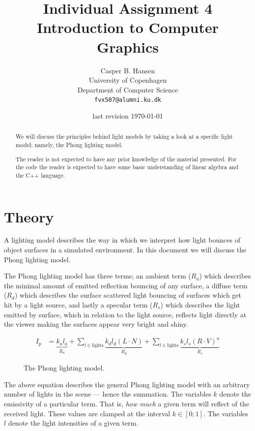 \documentclass[11pt]{article}
\title
{
    {\Large Individual Assignment 4} \\
    Introduction to Computer Graphics
}
\author
{
    Casper B. Hansen \\
    University of Copenhagen \\
    Department of Computer Science \\
    {\tt fvx507@alumni.ku.dk}
}
\date{last revision \today}
\begin{document}
\clearpage\maketitle\vspace{1in}
\begin{multicols}{2}
    \begin{abstract}
        We will discuss the principles behind light models by taking a look at
        a specific light model; namely, the Phong lighting model.
        
        The reader is not expected to have any prior knowledge of the material
        presented. For the code the reader is expected to have some basic
        understanding of linear algebra and the C++ language.
    \end{abstract}
    \vfill\columnbreak\tableofcontents\vfill
\end{multicols}
\thispagestyle{empty}\newpage

\section{Theory}
A lighting model describes the way in which we interpret how light bounces of
object surfaces in a simulated environment. In this document we will discuss
the Phong lighting model.

The Phong lighting model has three terms; an ambient term ($R_a$) which
describes the minimal amount of emitted reflection bouncing of any surface, a
diffuse term ($R_d$) which describes the surface scattered light bouncing of
surfaces which get hit by a light source, and lastly a specular term ($R_s$)
which describes the light emitted by surface, which in relation to the light
source, reflects light directly at the viewer making the surfaces appear very
bright and shiny.

\begin{figure}[H]
    \begin{align}
        I_p &= \underbrace{k_a l_a}_{R_a}
             + \sum_{l \in \text{lights}}
               \underbrace{k_d l_d (L \cdot N)}_{R_d}
             + \sum_{l \in \text{lights}}
               \underbrace{k_s l_s (R \cdot V)^n}_{R_s}
    \end{align}
    \caption{The Phong lighting model.}
    \label{eqn:phong-light-model}
\end{figure}

The above equation describes the general Phong lighting model with an
arbitrary number of lights in the scene --- hence the summation. The variables
$k$ denote the emissivity of a particular term. That is, {\it how much} a
given term will reflect of the received light. These values are clamped at the
interval $k \in [0;1]$. The variables $l$ denote the light intensities of a
given term.
\end{document}
